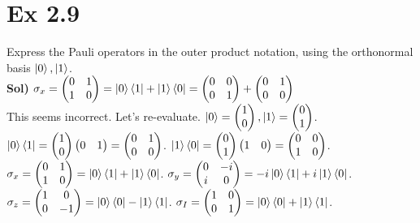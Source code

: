 \documentclass{article}
\newcommand{\0}{{$|0\rangle$}}
\newcommand{\1}{{$|1\rangle$}}
\begin{document}
\newpage

\section*{Ex 2.9}

Express the Pauli operators in the outer product notation, using the orthonormal basis $\ket{0}, \ket{1}$. \\
\textbf{Sol)} $\sigma_x = \begin{pmatrix} 0 & 1 \\ 1 & 0 \end{pmatrix} = \ket{0}\bra{1} + \ket{1}\bra{0} = \begin{pmatrix} 0 & 0 \\ 0 & 1 \end{pmatrix} + \begin{pmatrix} 0 & 1 \\ 0 & 0 \end{pmatrix}$ \\
This seems incorrect. Let's re-evaluate.
$\ket{0} = \begin{pmatrix} 1 \\ 0 \end{pmatrix}, \ket{1} = \begin{pmatrix} 0 \\ 1 \end{pmatrix}$.
$\ket{0}\bra{1} = \begin{pmatrix} 1 \\ 0 \end{pmatrix} \begin{pmatrix} 0 & 1 \end{pmatrix} = \begin{pmatrix} 0 & 1 \\ 0 & 0 \end{pmatrix}$.
$\ket{1}\bra{0} = \begin{pmatrix} 0 \\ 1 \end{pmatrix} \begin{pmatrix} 1 & 0 \end{pmatrix} = \begin{pmatrix} 0 & 0 \\ 1 & 0 \end{pmatrix}$.
$\sigma_x = \begin{pmatrix} 0 & 1 \\ 1 & 0 \end{pmatrix} = \ket{0}\bra{1} + \ket{1}\bra{0}$.
$\sigma_y = \begin{pmatrix} 0 & -i \\ i & 0 \end{pmatrix} = -i\ket{0}\bra{1} + i\ket{1}\bra{0}$.
$\sigma_z = \begin{pmatrix} 1 & 0 \\ 0 & -1 \end{pmatrix} = \ket{0}\bra{0} - \ket{1}\bra{1}$.
$\sigma_I = \begin{pmatrix} 1 & 0 \\ 0 & 1 \end{pmatrix} = \ket{0}\bra{0} + \ket{1}\bra{1}$.
\end{document}

